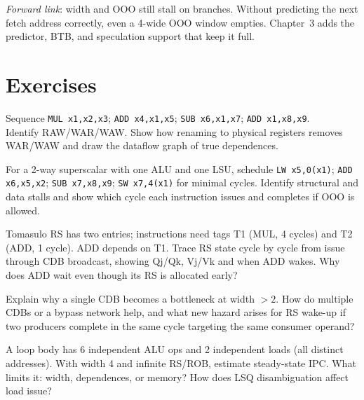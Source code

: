 \textit{Forward link}: width and OOO still stall on branches. Without predicting the next fetch address correctly, even a 4-wide OOO window empties. Chapter~3 adds the predictor, BTB, and speculation support that keep it full.


\section{Exercises}
\begin{exercise}Sequence \texttt{MUL x1,x2,x3}; \texttt{ADD x4,x1,x5}; \texttt{SUB x6,x1,x7}; \texttt{ADD x1,x8,x9}.\\ Identify RAW/WAR/WAW. Show how renaming to physical registers removes WAR/WAW and draw the dataflow graph of true dependences.\end{exercise}
\begin{exercise}For a 2-way superscalar with one ALU and one LSU, schedule \texttt{LW x5,0(x1)}; \texttt{ADD x6,x5,x2}; \texttt{SUB x7,x8,x9}; \texttt{SW x7,4(x1)} for minimal cycles. Identify structural and data stalls and show which cycle each instruction issues and completes if OOO is allowed.\end{exercise}
\begin{exercise}Tomasulo RS has two entries; instructions need tags T1 (MUL, 4 cycles) and T2 (ADD, 1 cycle). ADD depends on T1. Trace RS state cycle by cycle from issue through CDB broadcast, showing Qj/Qk, Vj/Vk and when ADD wakes. Why does ADD wait even though its RS is allocated early?\end{exercise}
\begin{exercise}Explain why a single CDB becomes a bottleneck at width $>2$. How do multiple CDBs or a bypass network help, and what new hazard arises for RS wake-up if two producers complete in the same cycle targeting the same consumer operand?\end{exercise}
\begin{exercise}A loop body has 6 independent ALU ops and 2 independent loads (all distinct addresses). With width 4 and infinite RS/ROB, estimate steady-state IPC. What limits it: width, dependences, or memory? How does LSQ disambiguation affect load issue?\end{exercise}
